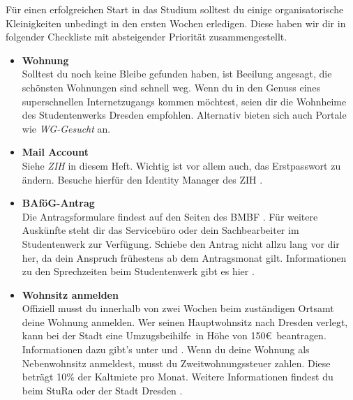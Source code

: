 \newcommand{\checkbox}[1]{\item[$\square$]\textbf{#1}\\}


Für einen erfolgreichen Start in das Studium solltest du einige organisatorische Kleinigkeiten unbedingt in den ersten Wochen erledigen.
Diese haben wir dir in folgender Checkliste mit absteigender Priorität zusammengestellt.

\begin{itemize}[leftmargin=*]

\checkbox{Wohnung}
Solltest du noch keine Bleibe gefunden haben, ist Beeilung angesagt, die schönsten Wohnungen sind schnell weg.
Wenn du in den Genuss eines superschnellen Internetzugangs kommen möchtest, seien dir die Wohnheime  des Studentenwerks Dresden empfohlen. Alternativ bieten sich auch Portale wie \textit{WG-Gesucht}  an.

\checkbox{Mail Account}
Siehe \textit{ZIH} in diesem Heft. Wichtig ist vor allem auch, das Erstpasswort zu ändern. Besuche hierfür den Identity Manager des ZIH .

\checkbox{BAföG-Antrag}
Die Antragsformulare findest auf den Seiten des BMBF . Für weitere Auskünfte steht dir das Servicebüro oder dein Sachbearbeiter im Studentenwerk zur Verfügung.
Schiebe den Antrag nicht allzu lang vor dir her, da dein Anspruch frühestens ab dem Antragsmonat gilt.
Informationen zu den Sprechzeiten beim Studentenwerk gibt es hier .

\checkbox{Wohnsitz anmelden}
Offiziell musst du innerhalb von zwei Wochen beim zuständigen Ortsamt  deine Wohnung anmelden.
Wer seinen Hauptwohnsitz nach Dresden verlegt, kann bei der Stadt eine \glqq Umzugsbeihilfe\grqq\ in Höhe von 150\euro\ beantragen.
Informationen dazu gibt's unter  und .
Wenn du deine Wohnung als Nebenwohnsitz anmeldest, musst du Zweitwohnungssteuer zahlen. Diese beträgt 10\% der Kaltmiete pro Monat. Weitere Informationen findest du beim StuRa  oder der Stadt Dresden .


\end{itemize}

